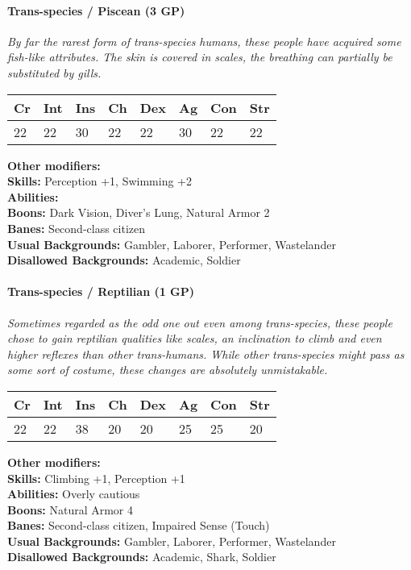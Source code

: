 \documentclass[12pt,a4paper,openany]{book}
\begin{document}
	\hrulefill
	\paragraph*{Trans-species / Piscean (3 GP)}
	\textit{By far the rarest form of trans-species humans, these people have acquired some fish-like attributes. The skin is covered in scales, the breathing can partially be substituted by gills.}\par
	\begin{tabular}{|l|l|l|l|l|l|l|l|}
		\hline
		Cr & Int & Ins & Ch & Dex & Ag & Con & Str \\ \hline
		22 & 22 & 30 & 22 & 22 & 30 & 22 & 22 \\ \hline
	\end{tabular}\par
	\noindent\textbf{Other modifiers:} \\
	\textbf{Skills:} Perception +1, Swimming +2\\
	\textbf{Abilities:} \\
	\textbf{Boons:} Dark Vision, Diver's Lung, Natural Armor 2\\
	\textbf{Banes:} Second-class citizen\\
	\textbf{Usual Backgrounds:} Gambler, Laborer, Performer, Wastelander\\
	\textbf{Disallowed Backgrounds:} Academic, Soldier
	
	\hrulefill
	\paragraph*{Trans-species / Reptilian (1 GP)}
	\textit{Sometimes regarded as the odd one out even among trans-species, these people chose to gain reptilian qualities like scales, an inclination to climb and even higher reflexes than other trans-humans.
		While other trans-species might pass as some sort of costume, these changes are absolutely unmistakable.}\par
	\begin{tabular}{|l|l|l|l|l|l|l|l|}
		\hline
		Cr & Int & Ins & Ch & Dex & Ag & Con & Str \\ \hline
		22 & 22 & 38 & 20 & 20 & 25 & 25 & 20 \\ \hline
	\end{tabular}\par
	\noindent\textbf{Other modifiers:} \\
	\textbf{Skills:} Climbing +1, Perception +1\\
	\textbf{Abilities:} Overly cautious\\
	\textbf{Boons:} Natural Armor 4\\
	\textbf{Banes:} Second-class citizen, Impaired Sense (Touch)\\
	\textbf{Usual Backgrounds:} Gambler, Laborer, Performer, Wastelander\\
	\textbf{Disallowed Backgrounds:} Academic, Shark, Soldier
	
\end{document}
